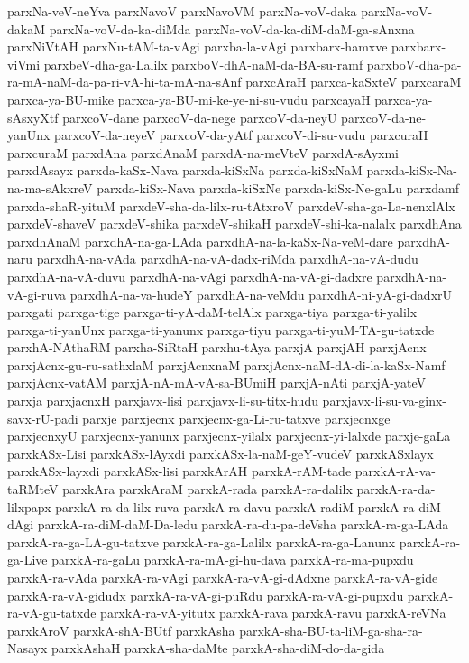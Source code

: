 {parxNa-veV-neYva
parxNavoV
parxNavoVM
parxNa-voV-daka
parxNa-voV-dakaM
parxNa-voV-da-ka-diMda
parxNa-voV-da-ka-diM-daM-ga-sAnxna
parxNiVtAH
parxNu-tAM-ta-vAgi
parxba-la-vAgi
parxbarx-hamxve
parxbarx-viVmi
parxbeV-dha-ga-Lalilx
parxboV-dhA-naM-da-BA-su-ramf
parxboV-dha-pa-ra-mA-naM-da-pa-ri-vA-hi-ta-mA-na-sAnf
parxcAraH
parxca-kaSxteV
parxcaraM
parxca-ya-BU-mike
parxca-ya-BU-mi-ke-ye-ni-su-vudu
parxcayaH
parxca-ya-sAsxyXtf
parxcoV-dane
parxcoV-da-nege
parxcoV-da-neyU
parxcoV-da-ne-yanUnx
parxcoV-da-neyeV
parxcoV-da-yAtf
parxcoV-di-su-vudu
parxcuraH
parxcuraM
parxdAna
parxdAnaM
parxdA-na-meVteV
parxdA-sAyxmi
parxdAsayx
parxda-kaSx-Nava
parxda-kiSxNa
parxda-kiSxNaM
parxda-kiSx-Na-na-ma-sAkxreV
parxda-kiSx-Nava
parxda-kiSxNe
parxda-kiSx-Ne-gaLu
parxdamf
parxda-shaR-yituM
parxdeV-sha-da-lilx-ru-tAtxroV
parxdeV-sha-ga-La-nenxlAlx
parxdeV-shaveV
parxdeV-shika
parxdeV-shikaH
parxdeV-shi-ka-nalalx
parxdhAna
parxdhAnaM
parxdhA-na-ga-LAda
parxdhA-na-la-kaSx-Na-veM-dare
parxdhA-naru
parxdhA-na-vAda
parxdhA-na-vA-dadx-riMda
parxdhA-na-vA-dudu
parxdhA-na-vA-duvu
parxdhA-na-vAgi
parxdhA-na-vA-gi-dadxre
parxdhA-na-vA-gi-ruva
parxdhA-na-va-hudeY
parxdhA-na-veMdu
parxdhA-ni-yA-gi-dadxrU
parxgati
parxga-tige
parxga-ti-yA-daM-telAlx
parxga-tiya
parxga-ti-yalilx
parxga-ti-yanUnx
parxga-ti-yanunx
parxga-tiyu
parxga-ti-yuM-TA-gu-tatxde
parxhA-NAthaRM
parxha-SiRtaH
parxhu-tAya
parxjA
parxjAH
parxjAcnx
parxjAcnx-gu-ru-sathxlaM
parxjAcnxnaM
parxjAcnx-naM-dA-di-la-kaSx-Namf
parxjAcnx-vatAM
parxjA-nA-mA-vA-sa-BUmiH
parxjA-nAti
parxjA-yateV
parxja
parxjacnxH
parxjavx-lisi
parxjavx-li-su-titx-hudu
parxjavx-li-su-va-ginx-savx-rU-padi
parxje
parxjecnx
parxjecnx-ga-Li-ru-tatxve
parxjecnxge
parxjecnxyU
parxjecnx-yanunx
parxjecnx-yilalx
parxjecnx-yi-lalxde
parxje-gaLa
parxkASx-Lisi
parxkASx-lAyxdi
parxkASx-la-naM-geY-vudeV
parxkASxlayx
parxkASx-layxdi
parxkASx-lisi
parxkArAH
parxkA-rAM-tade
parxkA-rA-va-taRMteV
parxkAra
parxkAraM
parxkA-rada
parxkA-ra-dalilx
parxkA-ra-da-lilxpapx
parxkA-ra-da-lilx-ruva
parxkA-ra-davu
parxkA-radiM
parxkA-ra-diM-dAgi
parxkA-ra-diM-daM-Da-ledu
parxkA-ra-du-pa-deVsha
parxkA-ra-ga-LAda
parxkA-ra-ga-LA-gu-tatxve
parxkA-ra-ga-Lalilx
parxkA-ra-ga-Lanunx
parxkA-ra-ga-Live
parxkA-ra-gaLu
parxkA-ra-mA-gi-hu-dava
parxkA-ra-ma-pupxdu
parxkA-ra-vAda
parxkA-ra-vAgi
parxkA-ra-vA-gi-dAdxne
parxkA-ra-vA-gide
parxkA-ra-vA-gidudx
parxkA-ra-vA-gi-puRdu
parxkA-ra-vA-gi-pupxdu
parxkA-ra-vA-gu-tatxde
parxkA-ra-vA-yitutx
parxkA-rava
parxkA-ravu
parxkA-reVNa
parxkAroV
parxkA-shA-BUtf
parxkAsha
parxkA-sha-BU-ta-liM-ga-sha-ra-Nasayx
parxkAshaH
parxkA-sha-daMte
parxkA-sha-diM-do-da-gida
}
